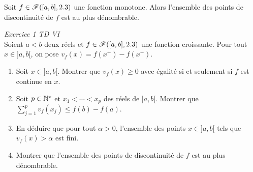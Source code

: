 \begin{tcolorbox}
    Soit $f \in \mathscr{F}([a, b], 2.3)$ une fonction monotone. Alors l'ensemble des points de discontinuité de $f$ est au plus dénombrable. 
\end{tcolorbox}

\begin{exercice}
    \emph{Exercice 1 TD VI} \\
    Soient $a < b$ deux réels et $f \in \mathscr{F}([a, b], 2.3)$ une fonction croissante. Pour tout $x \in ]a, b[$, on pose $v_f(x) = f(x^+)-f(x^-)$.
    \begin{enumerate}
        \item Soit $x \in ]a, b[$. Montrer que $v_f(x) \geqslant 0$ avec égalité si et seulement si $f$ est continue en $x$.
        \item Soit $p \in \mathbb{N}^\star$ et $x_1 < \cdots < x_p$ des réels de $]a, b[$. Montrer que $\sum\limits_{j=1}^p v_f(x_j) \leqslant f(b)-f(a)$.
        \item En déduire que pour tout $\alpha > 0$, l'ensemble des points $x \in ]a, b[$ tels que $v_f(x) > \alpha$ est fini. 
        \item Montrer que l'ensemble des points de discontinuité de $f$ est au plus dénombrable. 
    \end{enumerate}
\end{exercice}

